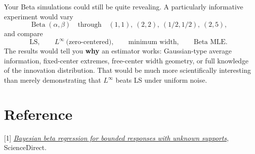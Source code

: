 \documentclass[10pt,a4paper]{article}
\begin{document}
Your Beta simulations could still be quite revealing. A particularly informative experiment would vary
\[
\operatorname{Beta}(\alpha,\beta)\quad\text{through}\quad
(1,1),\ (2,2),\ (1/2,1/2),\ (2,5),
\]
and compare
\[
\mathrm{LS},\qquad
L^\infty\ \text{(zero-centered)},\qquad
\text{minimum width},\qquad
\text{Beta MLE}.
\]
The results would tell you \textbf{why} an estimator works: Gaussian-type average information, fixed-center extremes, free-center width geometry, or full knowledge of the innovation distribution. That would be much more scientifically interesting than merely demonstrating that $L^\infty$ beats LS under uniform noise.

\section*{Reference}

{\small\color{muted}
[1] \href{https://www.sciencedirect.com/science/article/pii/S0167947321001791}{\textit{Bayesian beta regression for bounded responses with unknown supports}}, ScienceDirect.
}
\end{document}
